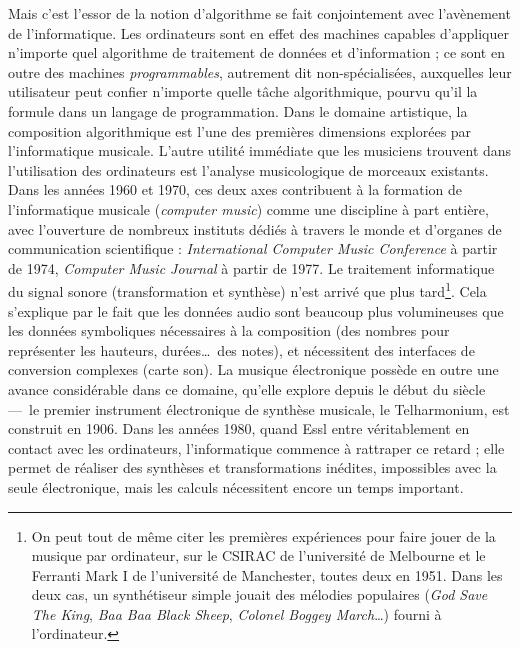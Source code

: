 \documentclass[a4paper,12pt]{article}
\begin{document}
Mais c'est l'essor de la notion d'algorithme se fait conjointement avec l'avènement de l'informatique. Les ordinateurs sont en effet des machines capables d'appliquer n'importe quel algorithme de traitement de données et d'information ; ce sont en outre des machines \emph{programmables}, autrement dit non-spécialisées, auxquelles leur utilisateur peut confier n'importe quelle tâche algorithmique, pourvu qu'il la formule dans un langage de programmation. Dans le domaine artistique, la composition algorithmique est l'une des premières dimensions explorées par l'informatique musicale. L'autre utilité immédiate que les musiciens trouvent dans l'utilisation des ordinateurs est l'analyse musicologique de morceaux existants. Dans les années 1960 et 1970, ces deux axes contribuent à la formation de l'informatique musicale (\emph{computer music}) comme une discipline à part entière, avec l'ouverture de nombreux instituts dédiés à travers le monde et d'organes de communication scientifique : \emph{International Computer Music Conference} à partir de 1974, \emph{Computer Music Journal} à partir de 1977. Le traitement informatique du signal sonore (transformation et synthèse) n'est arrivé que plus tard\footnote{On peut tout de même citer les premières expériences pour faire jouer de la musique par ordinateur, sur le CSIRAC de l'université de Melbourne et le Ferranti Mark I de l'université de Manchester, toutes deux en 1951. Dans les deux cas, un synthétiseur simple jouait des mélodies populaires (\emph{God Save The King}, \emph{Baa Baa Black Sheep}, \emph{Colonel Boggey March}\dots) fourni à l'ordinateur.}. Cela s'explique par le fait que les données audio sont beaucoup plus volumineuses que les données symboliques nécessaires à la composition (des nombres pour représenter les hauteurs, durées\dots~des notes), et nécessitent des interfaces de conversion complexes (carte son). La musique électronique possède en outre une avance considérable dans ce domaine, qu'elle explore depuis le début du siècle ---~le premier instrument électronique de synthèse musicale, le Telharmonium, est construit en 1906. Dans les années 1980, quand Essl entre véritablement en contact avec les ordinateurs, l'informatique commence à rattraper ce retard ; elle permet de réaliser des synthèses et transformations inédites, impossibles avec la seule électronique, mais les calculs nécessitent encore un temps important. \\
\end{document}
